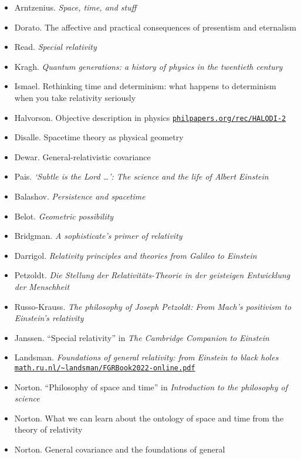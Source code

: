 \documentclass[11pt]{article}
\newcommand\rurl[1]{%
  \href{http://#1}{\nolinkurl{#1}}%
}
\begin{document}
\begin{itemize}
\item Arntzenius. \textit{Space, time, and stuff}
\item Dorato. The affective and practical consequences of presentism
  and eternalism
\item Read. \textit{Special relativity}
\item Kragh. \textit{Quantum generations: a history of physics in the
    twentieth century}
\item Ismael. Rethinking time and determinism: what happens to
  determinism when you take relativity seriously
\item Halvorson. Objective description in physics
  \rurl{philpapers.org/rec/HALODI-2}
\item Disalle. Spacetime theory as physical geometry
\item Dewar. General-relativistic covariance
\item Pais. \textit{`Subtle is the Lord \dots ': The science and the
    life of Albert Einstein}
\item Balashov. \emph{Persistence and spacetime}
\item Belot. \textit{Geometric possibility}  
\item Bridgman. \emph{A sophisticate's primer of relativity}
\item Darrigol. \textit{Relativity principles and theories from
    Galileo to Einstein}
\item Petzoldt. \emph{Die Stellung der Relativit{\"a}ts-Theorie in der
    geisteigen Entwicklung der Menschheit}
\item Russo-Krauss. \textit{The philosophy of Joseph Petzoldt: From
    Mach's positivism to Einstein's relativity}
\item Janssen. ``Special relativity'' in \emph{The Cambridge Companion
    to Einstein} 
\item Landsman. \textit{Foundations of general relativity: from
    Einstein to black holes}
  \rurl{math.ru.nl/~landsman/FGRBook2022-online.pdf}
\item Norton. ``Philosophy of space and time'' in \emph{Introduction
    to the philosophy of science}
\item Norton. What we can learn about the ontology of space and time
  from the theory of relativity
\item Norton. General covariance and the foundations of general

\end{itemize}
\end{document}

